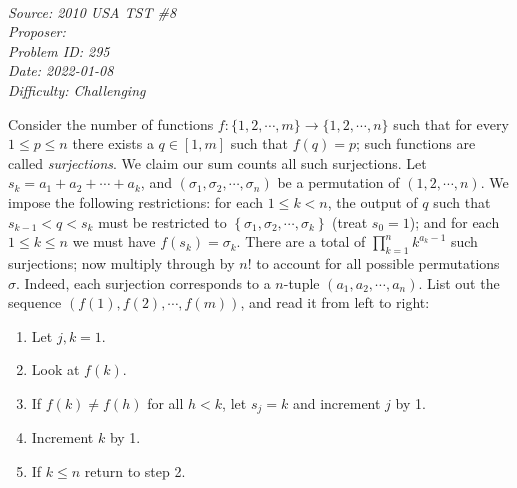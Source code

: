 \SSbreak\\
\emph{Source: 2010 USA TST \#8}\\
\emph{Proposer: \Paiya}\\
\emph{Problem ID: 295}\\
\emph{Date: 2022-01-08}\\
\emph{Difficulty: Challenging}\\
\SSbreak

\bigskip

\begin{solution}\hfil\medskip
  
    Consider the number of functions $f: \{1, 2, \cdots, m\} \to \{1, 2, \cdots , n\}$ such 
    that for every $1 \leq p \leq n$ there exists a $q \in [1, m]$ such that $f(q) = p$; such 
    functions are called \textit{surjections}. We claim our sum counts all such surjections. 
    Let $s_k = a_1 + a_2 + \cdots + a_k$, and $\left(\sigma_1, \sigma_2, \cdots , \sigma_n\right)$ 
    be a permutation of $(1, 2, \cdots , n)$. We impose the following restrictions: 
    for each $1 \leq k < n$, the output of $q$ such that $s_{k - 1} < q < s_k$ must be 
    restricted to $\left\{\sigma_1, \sigma_2, \cdots , \sigma_k\right\}$ (treat $s_0 = 1$); 
    and for each $1 \leq k \leq n$ we must have $f\left(s_k\right) = \sigma_k$. There are 
    a total of $\prod_{k = 1}^n k^{a_k - 1}$ such surjections; now multiply through by $n!$ 
    to account for all possible permutations $\sigma$. Indeed, each surjection corresponds 
    to a $n$-tuple $\left(a_1, a_2, \cdots , a_n\right)$. 
    List out the sequence $\left(f(1), f(2), \cdots , f(m)\right)$, and read it from left 
    to right: 

    \begin{enumerate}[noitemsep]
        \item Let $j, k = 1$.
        \item Look at $f(k).$
        \item If $f(k) \neq f(h)$ for all $h < k$, let $s_j = k$ and increment $j$ by 1.
        \item Increment $k$ by 1.
        \item If $k \leq n$ return to step 2.
    \end{enumerate}


\end{solution}
